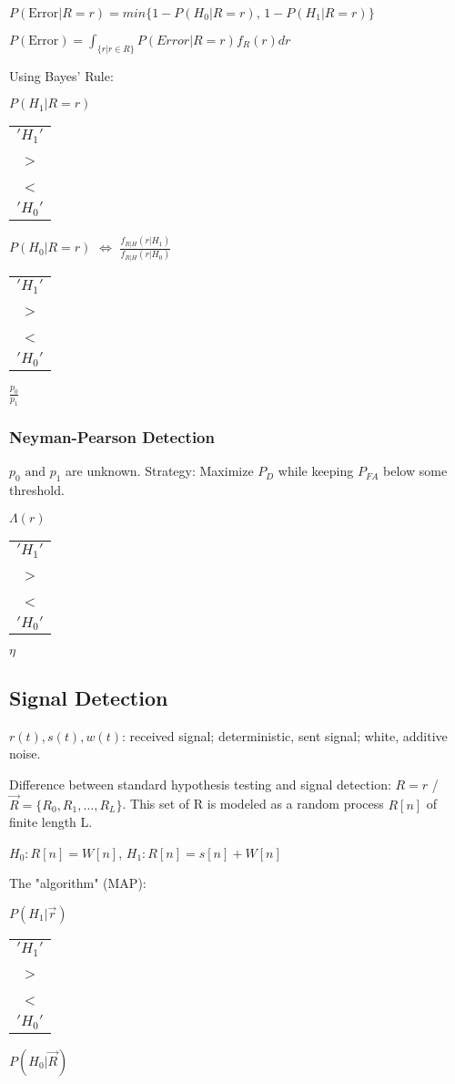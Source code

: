 \documentclass[8pt]{extarticle}
\begin{document}
\begin{multicols*}{3}
\begin{center}
\( P(\text{Error}|R=r) = min\{1-P(H_0|R=r)\text{, }1-P(H_1|R=r)\} \)

\( P(\text{Error}) = \int_{\{r|r \in R\}} P(Error|R=r)f_R(r) dr \)

Using Bayes' Rule:

\( P(H_1|R=r) \) \begin{tabular}{c} \( 'H_1' \) \\ > \\ < \\ \('H_0'\) \\ \end{tabular} \( P(H_0|R=r) \) \( \Leftrightarrow \) \( \frac{f_{R|H}(r|H_1)}{f_{R|H}(r|H_0)} \) \begin{tabular}{c} \( 'H_1' \) \\ > \\ < \\ \('H_0'\) \\ \end{tabular} \( \frac{p_0}{p_1} \)

\subsubsection{Neyman-Pearson Detection}
\( p_0 \text{ and } p_1 \) are unknown. Strategy: Maximize \( P_D \) while keeping \( P_{FA} \) below some threshold.

\( \Lambda(r) \) \begin{tabular}{c} \( 'H_1' \) \\ > \\ < \\ \('H_0'\) \\ \end{tabular} \( \eta \)


\subsection{Signal Detection}
\( r(t), s(t), w(t) \): received signal; deterministic, sent signal; white, additive noise.

Difference between standard hypothesis testing and signal detection: \( R = r \) / \( \vec{R} = \{ R_0, R_1, \ldots, R_L\} \). This set of R is modeled as a random process \( R[n] \) of finite length L.

\( H_0: R[n] = W[n] \), \( H_1: R[n] = s[n] + W[n] \)

The "algorithm" (MAP):

\( P(H_1|\vec{r}) \) \begin{tabular}{c} \( 'H_1' \) \\ > \\ < \\ \('H_0'\) \\ \end{tabular} \( P(H_0|\vec{R}) \)


\end{center}
\end{multicols*}
\end{document}
